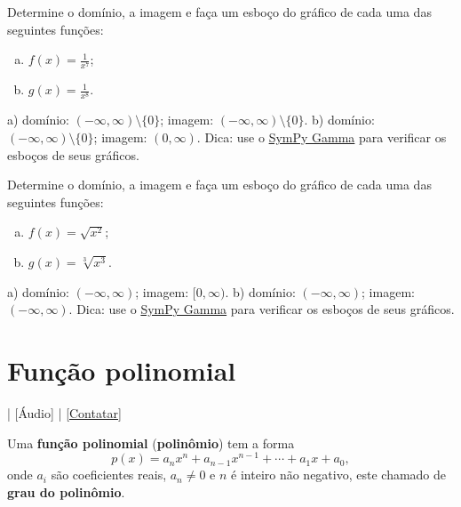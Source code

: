 \begin{exer}
  Determine o domínio, a imagem e faça um esboço do gráfico de cada uma das seguintes funções:
  \begin{enumerate}[a)]
  \item $\displaystyle f(x) = \frac{1}{x^7}$;
  \item $\displaystyle g(x) = \frac{1}{x^8}$.
  \end{enumerate}
\end{exer}
\begin{resp}
  a) domínio: $(-\infty, \infty)\setminus\{0\}$; imagem: $(-\infty, \infty)\setminus\{0\}$. b) domínio: $(-\infty, \infty)\setminus\{0\}$; imagem: $(0, \infty)$. Dica: use o \href{https://www.sympygamma.com/}{SymPy Gamma} para verificar os esboços de seus gráficos.
\end{resp}

\begin{exer}
  Determine o domínio, a imagem e faça um esboço do gráfico de cada uma das seguintes funções:
  \begin{enumerate}[a)]
  \item $\displaystyle f(x) = \sqrt{x^2}$;
  \item $\displaystyle g(x) = \sqrt[3]{x^3}$.
  \end{enumerate}
\end{exer}
\begin{resp}
  a) domínio: $(-\infty, \infty)$; imagem: $[0, \infty)$. b) domínio: $(-\infty, \infty)$; imagem: $(-\infty, \infty)$. Dica: use o \href{https://www.sympygamma.com/}{SymPy Gamma} para verificar os esboços de seus gráficos.
\end{resp}


\section{Função polinomial}\label{cap_funcao_sec_funpoli}

\begin{flushright}
  [Vídeo] | [Áudio] | \href{https://phkonzen.github.io/notas/contato.html}{[Contatar]}
\end{flushright}

Uma {\bf função polinomial} ({\bf polinômio}) tem a forma
\begin{equation}
  p(x) = a_nx^n + a_{n-1}x^{n-1} + \cdots + a_1x + a_0,
\end{equation}
onde $a_i$ são coeficientes reais, $a_n\neq 0$ e $n$ é inteiro não negativo, este chamado de {\bf grau do polinômio}.

